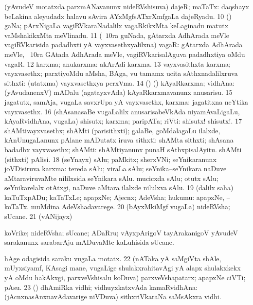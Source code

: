 {{ (yAvudeV motatxda parxmANavanunx nideRVshisuva) dajeR;
maTaTx:  daqshayx beLakina aleyudadx halavu sAvira
AYxMgfsATxrXmfgaLa dajeRyadu. 
\num{10} (\jiVvi) gaNa; pArxNigaLa vagiRVkaraNadalilx vagaRkikxMta
keLaginadu matutx vaMshakikxMta meVlinadu.
\num{11} (\sA\ $10$ra guNada, gAtarxda AdhArada meVle vagiRVkarisida
padadhxti yA vayxvasethxyalilxna) vagaR: 
gAtarxda AdhArada meVle, \sA\ $10$ra GAtada AdhArada meVle,
vagiRVkarisalAguva padadhxtiya oMdu vagaR.
\num{12} karxma; anukarxma:  akArAdi karxma. 
\num{13} vayxvasithxta karxma; vayxvasethx; parxtiyoMdu aMsha, BAga,
\mo vu tamamx ucita sAthxnadalilxruva sithxti: 
(utatxma) vayxvasethxya perxVma.
\num{14} (\birx) (\pArxparx) kAyaRkarxma; vidhAna:  (yAvudanenxV) mADalu (agatayxvAda) kAyaRkarxmavanunx anusarisu.
\num{15} jagatutx, samAja, \mo vugaLa savxrUpa yA vayxvasethx, karxma:
 jagatitxna neYtika vayxvasethx.
\num{16} (shAsanasaBe \mo vugaLalilx anusarisabeVkAda niyamAvaLigaLu,
kAyaRvidhAna, \mo vugaLa) shisutx; karxma; paripATa; riVti:
 shisutx! shisutx!.
\num{17} shAMtivayxvasethx; shAMti (parisithxti); galaBe, goMdalagaLu
ilalxde, kAnUnugaLanunx pAlane mADutatx iruva sithxti:  shAMta sithxti; shAsana badadhx vayxvasethx; shAMti:  shAMtiyanunx punaH sAthxpisalAyitu.  shAMti (sithxti) pAlisi.
\num{18} (seYnayx) sAlu; paMkitx; sherxVNi; seYnikaranunx joVDisiruva
karxma:  tereda sAlu; viraLa sAlu; seYnika--seYnikara
naDuve aMtaraviruvaMte nililxsida seYnikara sAlu. 
mucicxda sAlu; otutx sAlu; seYnikarelalx otAtxgi, naDuve aMtara
ilalxde nilulxva sAlu.
\num{19} (\bava dalilx saha) kaTuTxpADu; kaTaTxLe; apapxNe; Ajecnx;
AdeVsha; hukumu:  apapxNe, --koTaTx.  muMdina AdeVshadavarege.
\num{20} (bAyxMkiMgf \mo vugaLa) nideRVsha; sUcane.
\num{21} (vANijayx) 

 koVrike; nideRVsha; sUcane; ADaRru; vAyxpArigoV
tayArakanigoV yAvudeV sarakanunx sarabarAju mADuvaMte kaLuhisida
sUcane.

 hAge odagisida saraku \mo vugaLa motatx. 
\num{22} (nATaka yA saMgiVta shAle, mUyxsiyamf, KAsagi mane, \mo
vugaLige shulakxrahitavAgi yA alapx shulakxkekx yA oMdu hakAkxgi,
parxveVshisalu koDuva) parxveVshapatarx; apapxNe ciVTi; pAsu.
\num{23} (\kerxY) dhAmiRka vidhi; vidhuyxkatxvAda kamaRvidhAna:
 (jAcnxnasAnxnavAdavarige niVDuva)
sithxriVkaraNa saMsAkxra vidhi.}} 


